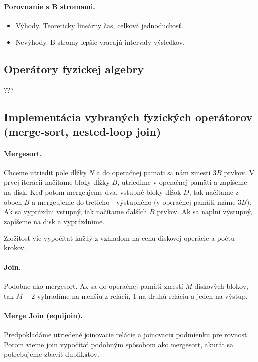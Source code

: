 \documentclass[10pt,a4paper]{article}
\begin{document}
\paragraph{Porovnanie s B stromami.}

\begin{itemize}
\item Výhody. Teoreticky lineárny čas, celková jednoduchosť.
\item Nevýhody. B stromy lepšie vracajú intervaly výsledkov. 
\end{itemize}

\subsection{Operátory fyzickej algebry}
???


\subsection{Implementácia vybraných fyzických operátorov (merge-sort, nested-loop join)}

\paragraph{Mergesort.}
Chceme utriediť pole dĺžky $N$ a do operačnej pamäti sa nám zmestí $3B$ prvkov.
V prvej iterácii načítame bloky dĺžky $B$, utriedime v operačnej pamäti a zapíšeme na disk. 
Keď potom mergeujeme dva, vstupné bloky dĺžok $D$, tak načítame z oboch $B$ a mergeujeme do tretieho - výstupného (v operačnej pamäti máme $3B$). Ak sa vyprázdni vstupný, tak načítame ďalších $B$ prvkov. Ak sa naplní výstupný, zapíšeme na disk a vyprázdnime. 

Zložitosť vie vypočítať každý z vzhľadom na cenu diskovej operácie a počtu krokov. 

\paragraph{Join.}
Podobne ako mergesort. Ak sa do operačnej pamäti zmestí $M$ diskových blokov,
tak $M-2$ vyhradíme na menšiu z relácií, 1 na druhú reláciu a jeden na výstup. 

\paragraph{Merge Join (equijoin).}
Predpokladáme utriedené joinovacie relácie a joinovaciu podmienku pre rovnosť.
Potom vieme join vypočítať podobným spôsobom ako mergesort, akurát sa potrebujeme zbaviť duplikátov. 
\end{document}
